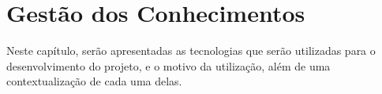 \chapter{Gestão dos Conhecimentos}

Neste capítulo, serão apresentadas as tecnologias que serão utilizadas para o desenvolvimento do projeto, e o motivo da utilização, além de uma contextualização de cada uma delas.







